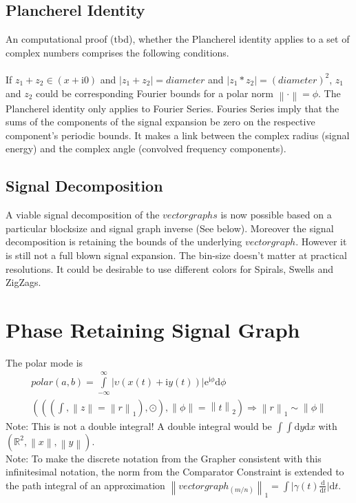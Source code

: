 \documentclass{report}
\newcommand\norm[1]{\left\lVert#1\right\rVert}
\begin{document}
\subsection{Plancherel Identity}
An computational proof (tbd), whether the Plancherel identity applies to a set of complex numbers comprises the following conditions.\\\\
If $z_{1}+z_{2}\in (x+\mathrm{i}0)$ and $\lvert z_{1}+z_{2}\rvert=diameter$ and $\lvert z_{1}*z_{2}\rvert=(diameter)^2$, $z_{1}$ and $z_{2}$ could be corresponding Fourier bounds for a polar norm $\norm{\cdot}=\phi$.
The Plancherel identity only applies to Fourier Series. Fouries Series imply that the sums of the components of the signal expansion be zero on the respective component's periodic bounds. It makes a link between the complex radius (signal energy) and the complex angle (convolved frequency components).
\subsection{Signal Decomposition}
A viable signal decomposition of the $vectorgraphs$ is now possible based on a particular blocksize and signal graph inverse (See below). Moreover the signal decomposition is retaining the bounds of the underlying $vectorgraph$. However it is still not a full blown signal expansion. The bin-size doesn't matter at practical resolutions. It could be desirable to use different colors for Spirals, Swells and ZigZags.

\section{Phase Retaining Signal Graph}
The polar mode is
\begin{align}
polar(a,b)=\int \limits _{-\infty}^{\infty} \lvert \upsilon (x(t)+\mathrm{i}y(t))\rvert \mathrm{e}^{\mathrm{i}\phi} \mathrm{d}\phi\\
(((\int,\norm{z}=\norm{r}_1),\odot),\norm{\phi}= \norm{t}_2)\Rightarrow \norm{r}_1 \sim \norm{\phi}
\end{align}
Note: This is not a double integral! A double integral would be $\int \int \mathrm{d}y\mathrm{d}x$ with $(\mathbb{R}^2,\norm{x},\norm{y})$.\\
Note: To make the discrete notation from the Grapher consistent with this infinitesimal notation, the norm from the Comparator Constraint is extended to the path integral of an approximation $\norm{vectorgraph_{(m/n)}}_1=\int \lvert \gamma (t) \frac{\mathrm{d}}{\mathrm{d}t} \rvert \mathrm{d}t$.
\end{document}
